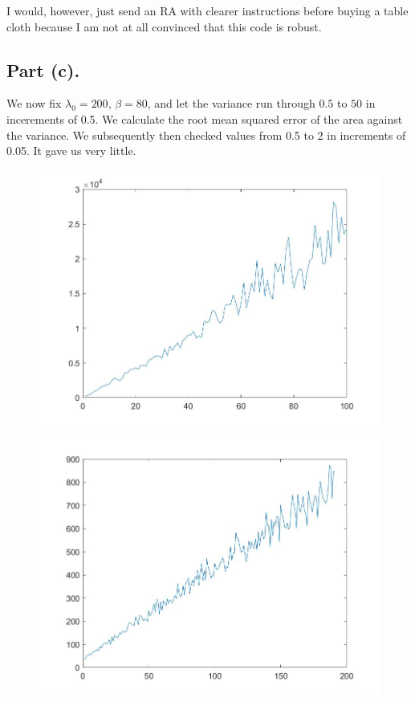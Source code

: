 \documentclass{article}
\begin{document}
I would, however, just send an RA with clearer instructions before buying a table cloth because I am not at all convinced that this code is robust.

\subsection{Part (c).} 
We now fix $\lambda_{0}=200$, $\beta=80$, and let the variance run through $0.5$ to $50$ in incerements of 0.5. We calculate the root mean squared error of the area against the variance. We subsequently then checked values from 0.5 to 2 in increments of 0.05. It gave us very little.

\begin{figure}[h]
\centering
\includegraphics[width=13cm]{q7partc1.jpeg}
\end{figure} 
\begin{figure}[h]
\centering
\includegraphics[width=13cm]{q7partc2.jpeg}
\end{figure} 
\end{document}
